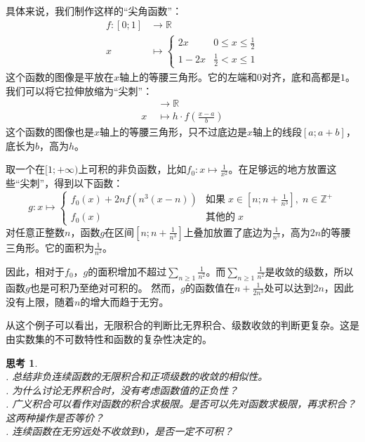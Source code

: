 \documentclass[12pt,UTF8]{ctexbook}
\theoremstyle{definition}
\theoremstyle{plain}
\newtheorem{sk}{思考}[section]
\begin{document}
具体来说，我们制作这样的“尖角函数”：
\begin{align*}
    f: [0;1] &\rightarrow \mathbb{R} \\
x \;&\mapsto \begin{cases}
    2x & 0\leqslant x \leqslant \frac{1}{2} \\
    1 - 2x & \frac{1}{2} < x \leqslant 1
\end{cases} 
\end{align*}
这个函数的图像是平放在$x$轴上的等腰三角形。它的左端和$0$对齐，底和高都是$1$。我们可以将它拉伸放缩为“尖刺”：
\begin{align*}
   [a;a+b] &\rightarrow \mathbb{R} \\
    x \;&\mapsto h\cdot f\left(\frac{x-a}{b}\right)
\end{align*}
这个函数的图像也是$x$轴上的等腰三角形，只不过底边是$x$轴上的线段$[a;a+b]$，底长为$b$，高为$h$。

取一个在$[1;+\infty)$上可积的非负函数，比如$\displaystyle f_0: x\mapsto \frac{1}{x^2}$。在足够远的地方放置这些“尖刺”，得到以下函数：
$$
g: x\mapsto \begin{cases}
    \displaystyle f_0(x) + 2n f\left(n^3(x - n)\right) & \mbox{如果}\; x \in \left[n;n+\frac{1}{n^3}\right],\; n\in\mathbb{Z}^+ \\
    f_0(x) & \mbox{其他的}\;x
\end{cases}
$$
对任意正整数$n$，函数$g$在区间$\left[n;n+\frac{1}{n^3}\right]$上叠加放置了底边为$\frac{1}{n^3}$，高为$2n$的等腰三角形。它的面积为$\frac{1}{n^2}$。

因此，相对于$f_0$，$g$的面积增加不超过$\displaystyle \sum_{n\geqslant 1} \frac{1}{n^2}$。而$\displaystyle \sum_{n\geqslant 1} \frac{1}{n^2}$是收敛的级数，所以函数$g$也是可积乃至绝对可积的。
然而，$g$的函数值在$n+\frac{1}{2n^3}$处可以达到$2n$，因此没有上限，随着$n$的增大而趋于无穷。

从这个例子可以看出，无限积合的判断比无界积合、级数收敛的判断更复杂。这是由实数集的不可数特性和函数的复杂性决定的。

\begin{sk}
    \mbox{} \\
    . 总结非负连续函数的无限积合和正项级数的收敛的相似性。\\
    . 为什么讨论无界积合时，没有考虑函数值的正负性？\\
    . 广义积合可以看作对函数的积合求极限。是否可以先对函数求极限，再求积合？这两种操作是否等价？\\
    . 连续函数在无穷远处不收敛到$0$，是否一定不可积？
\end{sk}
\end{document}
